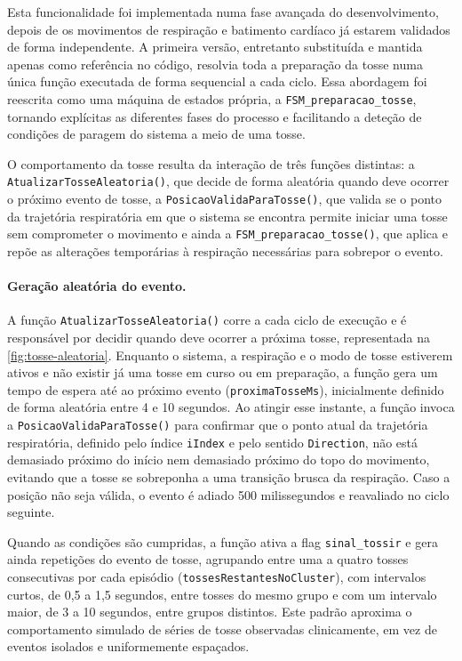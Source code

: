 Esta funcionalidade foi implementada numa fase avançada do desenvolvimento, depois de os movimentos de respiração e batimento cardíaco já estarem validados de forma independente. A primeira versão, entretanto substituída e mantida apenas como referência no código, resolvia toda a preparação da tosse numa única função executada de forma sequencial a cada ciclo. Essa abordagem foi reescrita como uma máquina de estados própria, a \texttt{FSM\_preparacao\_tosse}, tornando explícitas as diferentes fases do processo e facilitando a deteção de condições de paragem do sistema a meio de uma tosse.

O comportamento da tosse resulta da interação de três funções distintas: a \texttt{AtualizarTosseAleatoria()}, que decide de forma aleatória quando deve ocorrer o próximo evento de tosse, a \texttt{PosicaoValidaParaTosse()}, que valida se o ponto da trajetória respiratória em que o sistema se encontra permite iniciar uma tosse sem comprometer o movimento e ainda a \texttt{FSM\_preparacao\_tosse()}, que aplica e repõe as alterações temporárias à respiração necessárias para sobrepor o evento.

\paragraph{Geração aleatória do evento.}
A função \texttt{AtualizarTosseAleatoria()} corre a cada ciclo de execução e é responsável por decidir quando deve ocorrer a próxima tosse, representada na \cref{fig:tosse-aleatoria}. Enquanto o sistema, a respiração e o modo de tosse estiverem ativos e não existir já uma tosse em curso ou em preparação, a função gera um tempo de espera até ao próximo evento (\texttt{proximaTosseMs}), inicialmente definido de forma aleatória entre 4 e 10 segundos. Ao atingir esse instante, a função invoca a \texttt{PosicaoValidaParaTosse()} para confirmar que o ponto atual da trajetória respiratória, definido pelo índice \texttt{iIndex} e pelo sentido \texttt{Direction}, não está demasiado próximo do início nem demasiado próximo do topo do movimento, evitando que a tosse se sobreponha a uma transição brusca da respiração. Caso a posição não seja válida, o evento é adiado 500 milissegundos e reavaliado no ciclo seguinte.

Quando as condições são cumpridas, a função ativa a flag \texttt{sinal\_tossir} e gera ainda repetições do evento de tosse, agrupando entre uma a quatro tosses consecutivas por cada episódio (\texttt{tossesRestantesNoCluster}), com intervalos curtos, de 0,5 a 1,5 segundos, entre tosses do mesmo grupo e com um intervalo maior, de 3 a 10 segundos, entre grupos distintos. Este padrão aproxima o comportamento simulado de séries de tosse observadas clinicamente, em vez de eventos isolados e uniformemente espaçados.

